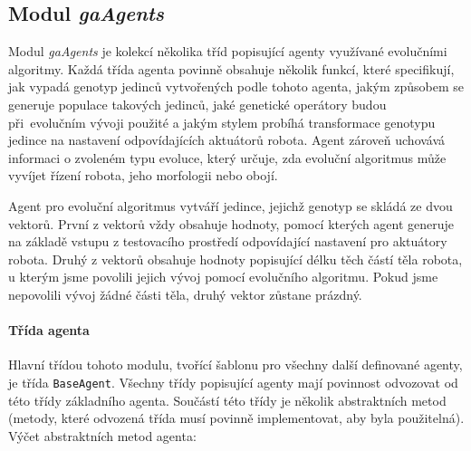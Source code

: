 \subsection{Modul \emph{gaAgents}} \label{imp:gaAgents}
Modul \emph{gaAgents} je kolekcí několika tříd popisující agenty využívané
evolučními algoritmy. Každá třída agenta povinně obsahuje několik funkcí, které
specifikují, jak vypadá genotyp jedinců vytvořených podle tohoto agenta, jakým
způsobem se generuje populace takových jedinců, jaké genetické operátory budou
při~evolučním vývoji použité a jakým stylem probíhá transformace genotypu
jedince na nastavení odpovídajících aktuátorů robota. Agent zároveň uchovává
informaci o zvoleném typu evoluce, který určuje, zda evoluční algoritmus může
vyvíjet řízení robota, jeho morfologii nebo obojí.

Agent pro evoluční algoritmus vytváří jedince, jejichž genotyp se skládá ze
dvou vektorů. První z vektorů vždy obsahuje hodnoty, pomocí kterých agent
generuje na základě vstupu z testovacího prostředí odpovídající nastavení pro
aktuátory robota. Druhý z vektorů obsahuje hodnoty popisující délku těch částí
těla robota, u kterým jsme povolili jejich vývoj pomocí evolučního algoritmu.
Pokud jsme nepovolili vývoj žádné části těla, druhý vektor zůstane prázdný.

\paragraph{Třída agenta}
Hlavní třídou tohoto modulu, tvořící šablonu pro všechny další definované
agenty, je třída \texttt{BaseAgent}. Všechny třídy popisující agenty mají
povinnost odvozovat od této třídy základního agenta. Součástí této třídy je
několik abstraktních metod (metody, které odvozená třída musí povinně
implementovat, aby byla použitelná). Výčet abstraktních metod agenta:

